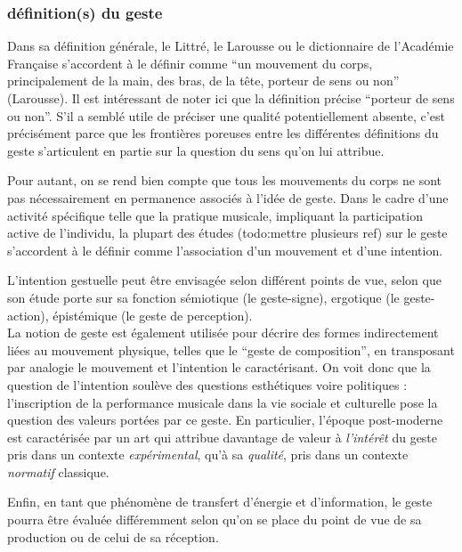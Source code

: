 \subsubsection{définition(s) du geste}
Dans sa définition générale, le Littré, le Larousse ou le dictionnaire de l'Académie Française s'accordent à le définir comme ``un mouvement du corps, principalement de la main, des bras, de la tête, porteur de sens ou non'' (Larousse). Il est intéressant de noter ici que la définition précise ``porteur de sens ou non''. S'il a semblé utile de préciser une qualité potentiellement absente, c'est précisément parce que les frontières poreuses entre les différentes définitions du geste s'articulent en partie sur la question du sens qu'on lui attribue.

Pour autant, on se rend bien compte que tous les mouvements du corps ne sont pas nécessairement en permanence associés à l'idée de geste. Dans le cadre d'une activité spécifique telle que la pratique musicale, impliquant la participation active de l'individu, la plupart des études (todo:mettre plusieurs ref) sur le geste s'accordent à le définir comme l'association d'un mouvement et d'une intention.

 \cite{imberty_mouvement_2013}

\noindent L'intention gestuelle peut être envisagée selon différent points de vue, selon que son étude porte sur sa fonction sémiotique (le geste-signe), ergotique (le geste-action), épistémique (le geste de perception).\\
\indent La notion de geste est également utilisée pour décrire des formes indirectement liées au mouvement physique, telles que le ``geste de composition'', en transposant par analogie le mouvement et l'intention le caractérisant. On voit donc que la question de l'intention soulève des questions esthétiques voire politiques : l'inscription de la performance musicale dans la vie sociale et culturelle pose la question des valeurs portées par ce geste. En particulier, l'époque post-moderne est caractérisée par un art qui attribue davantage de valeur à \textit{l'intérêt} du geste pris dans un contexte \textit{expérimental}, qu'à sa \textit{qualité}, pris dans un contexte \textit{normatif} classique.

\indent Enfin, en tant que phénomène de transfert d'énergie et d'information, le geste pourra être évaluée différemment selon qu'on se place du point de vue de sa production ou de celui de sa réception. 

